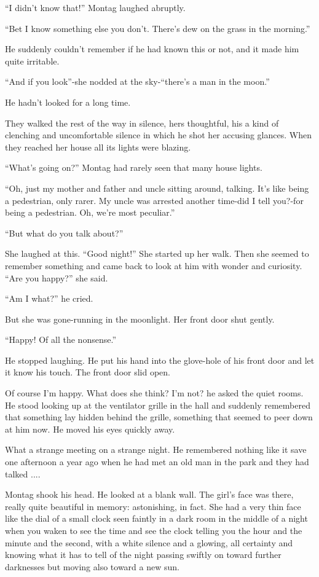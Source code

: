 \documentclass[11pt,openany]{book}
\begin{document}
``I didn't know that!'' Montag laughed abruptly.

``Bet I know something else you don't. There's dew on the grass in the morning.''

He suddenly couldn't remember if he had known this or not, and it made him quite irritable.

``And if you look''-she nodded at the sky-``there's a man in the moon.''

He hadn't looked for a long time.

They walked the rest of the way in silence, hers thoughtful, his a kind of clenching and uncomfortable silence in which he shot her accusing glances. When they reached her house all its lights were blazing.

``What's going on?'' Montag had rarely seen that many house lights.

``Oh, just my mother and father and uncle sitting around, talking. It's like being a pedestrian, only rarer. My uncle was arrested another time-did I tell you?-for being a pedestrian. Oh, we're most peculiar.''

``But what do you talk about?''

She laughed at this. ``Good night!'' She started up her walk. Then she seemed to remember something and came back to look at him with wonder and curiosity. ``Are you happy?'' she said.

``Am I what?'' he cried.

But she was gone-running in the moonlight. Her front door shut gently.

``Happy! Of all the nonsense.''

He stopped laughing. He put his hand into the glove-hole of his front door and let it know his touch. The front door slid open.

Of course I'm happy. What does she think? I'm not? he asked the quiet rooms. He stood looking up at the ventilator grille in the hall and suddenly remembered that something lay hidden behind the grille, something that seemed to peer down at him now. He moved his eyes quickly away.

What a strange meeting on a strange night. He remembered nothing like it save one afternoon a year ago when he had met an old man in the park and they had talked ....

Montag shook his head. He looked at a blank wall. The girl's face was there, really quite beautiful in memory: astonishing, in fact. She had a very thin face like the dial of a small clock seen faintly in a dark room in the middle of a night when you waken to see the time and see the clock telling you the hour and the minute and the second, with a white silence and a glowing, all certainty and knowing what it has to tell of the night passing swiftly on toward further darknesses but moving also toward a new sun.
\end{document}
